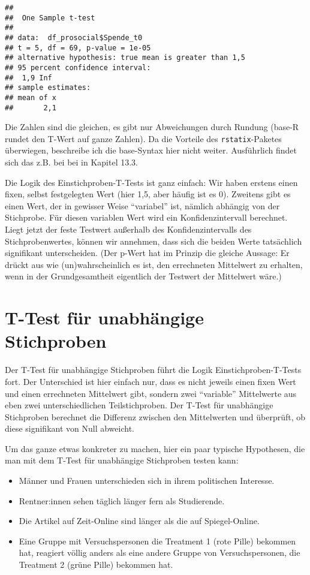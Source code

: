 \documentclass[
]{book}
\begin{document}
\begin{verbatim}
## 
##  One Sample t-test
## 
## data:  df_prosocial$Spende_t0
## t = 5, df = 69, p-value = 1e-05
## alternative hypothesis: true mean is greater than 1,5
## 95 percent confidence interval:
##  1,9 Inf
## sample estimates:
## mean of x 
##       2,1
\end{verbatim}

Die Zahlen sind die gleichen, es gibt nur Abweichungen durch Rundung (base-R rundet den T-Wert auf ganze Zahlen). Da die Vorteile des \texttt{rstatix}-Paketes überwiegen, beschreibe ich die base-Syntax hier nicht weiter. Ausführlich findet sich das z.B. bei bei \citet{Phillips_2018} in Kapitel 13.3.

Die Logik des Einstichproben-T-Tests ist ganz einfach: Wir haben erstens einen fixen, selbst festgelegten Wert (hier 1,5, aber häufig ist es 0). Zweitens gibt es einen Wert, der in gewisser Weise ``variabel'' ist, nämlich abhängig von der Stichprobe. Für diesen variablen Wert wird ein Konfidenzintervall berechnet. Liegt jetzt der feste Testwert außerhalb des Konfidenzintervalls des Stichprobenwertes, können wir annehmen, dass sich die beiden Werte tatsächlich signifikant unterscheiden. (Der p-Wert hat im Prinzip die gleiche Aussage: Er drückt aus wie (un)wahrscheinlich es ist, den errechneten Mittelwert zu erhalten, wenn in der Grundgesamtheit eigentlich der Testwert der Mittelwert wäre.)

\hypertarget{t-test-fuxfcr-unabhuxe4ngige-stichproben}{%
\section{T-Test für unabhängige Stichproben}\label{t-test-fuxfcr-unabhuxe4ngige-stichproben}}

Der T-Test für unabhängige Stichproben führt die Logik Einstichproben-T-Tests fort. Der Unterschied ist hier einfach nur, dass es nicht jeweils einen fixen Wert und einen errechneten Mittelwert gibt, sondern zwei ``variable'' Mittelwerte aus eben zwei unterschiedlichen Teilstichproben. Der T-Test für unabhängige Stichproben berechnet die Differenz zwischen den Mittelwerten und überprüft, ob diese signifikant von Null abweicht.

Um das ganze etwas konkreter zu machen, hier ein paar typische Hypothesen, die man mit dem T-Test für unabhängige Stichproben testen kann:

\begin{itemize}
\item
  Männer und Frauen unterschieden sich in ihrem politischen Interesse.
\item
  Rentner:innen sehen täglich länger fern als Studierende.
\item
  Die Artikel auf Zeit-Online sind länger als die auf Spiegel-Online.
\item
  Eine Gruppe mit Versuchspersonen die Treatment 1 (rote Pille) bekommen hat, reagiert völlig anders als eine andere Gruppe von Versuchspersonen, die Treatment 2 (grüne Pille) bekommen hat.
\end{itemize}
\end{document}
